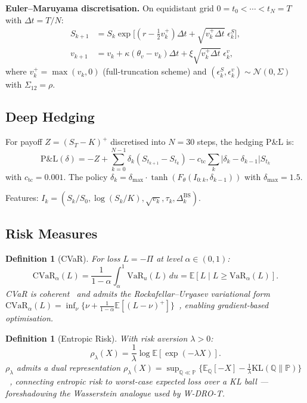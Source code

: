 \documentclass[11pt]{article}
\newtheorem{definition}[theorem]{Definition}
\newcommand{\E}{\mathbb{E}}
\newcommand{\PP}{\mathbb{P}}
\newcommand{\QQ}{\mathbb{Q}}
\newcommand{\cvar}{\mathrm{CVaR}}
\newcommand{\VaR}{\mathrm{VaR}}
\begin{document}
\textbf{Euler--Maruyama discretisation.}  On equidistant grid $0=t_0 < \cdots < t_N = T$ with $\Delta t = T/N$:
\begin{align}
    S_{k+1} &= S_k \exp\!\bigl[(r - \tfrac{1}{2}v_k^+)\Delta t + \sqrt{v_k^+\Delta t}\;\epsilon_k^S\bigr], \label{eq:euler_s}\\
    v_{k+1} &= v_k + \kappa(\theta_v - v_k)\Delta t + \xi\sqrt{v_k^+\Delta t}\;\epsilon_k^v, \label{eq:euler_v}
\end{align}
where $v_k^+ = \max(v_k, 0)$ (full-truncation scheme) and $(\epsilon_k^S, \epsilon_k^v) \sim \mathcal{N}(0, \Sigma)$ with $\Sigma_{12} = \rho$.

\subsection{Deep Hedging}

For payoff $Z = (S_T - K)^+$ discretised into $N = 30$ steps, the hedging P\&L is:
\begin{equation}
    \mathrm{P\&L}(\delta) = -Z + \sum_{k=0}^{N-1} \delta_k (S_{t_{k+1}} - S_{t_k}) - c_{\mathrm{tc}} \sum_{k} |\delta_k - \delta_{k-1}| S_{t_k}
    \label{eq:pnl}
\end{equation}
with $c_{\mathrm{tc}} = 0.001$. The policy $\delta_k = \delta_{\max} \cdot \tanh(F_\theta(I_{0:k}, \delta_{k-1}))$ with $\delta_{\max} = 1.5$.

Features: $I_k = (S_k/S_0, \log(S_k/K), \sqrt{v_k}, \tau_k, \Delta_k^{\mathrm{BS}})$.

\subsection{Risk Measures}

\begin{definition}[CVaR]
\label{def:cvar}
For loss $L = -\Pi$ at level $\alpha \in (0,1)$:
\begin{equation}
    \cvar_\alpha(L) = \frac{1}{1-\alpha}\int_\alpha^1 \VaR_u(L)\,du = \E[L \mid L \geq \VaR_\alpha(L)].
\end{equation}
CVaR is coherent~\citep{artzner1999coherent} and admits the Rockafellar--Uryasev variational form $\cvar_\alpha(L) = \inf_\nu\{\nu + \frac{1}{1-\alpha}\E[(L-\nu)^+]\}$~\citep{rockafellar2000optimization}, enabling gradient-based optimisation.
\end{definition}

\begin{definition}[Entropic Risk]
\label{def:entropic}
With risk aversion $\lambda > 0$:
\begin{equation}
    \rho_\lambda(X) = \frac{1}{\lambda} \log \E[\exp(-\lambda X)].
\end{equation}
$\rho_\lambda$ admits a dual representation $\rho_\lambda(X) = \sup_{\QQ \ll \PP}\{\E_\QQ[-X] - \frac{1}{\lambda}\mathrm{KL}(\QQ\|\PP)\}$~\citep{follmer2002convex}, connecting entropic risk to worst-case expected loss over a KL ball --- foreshadowing the Wasserstein analogue used by W-DRO-T.
\end{definition}
\end{document}
